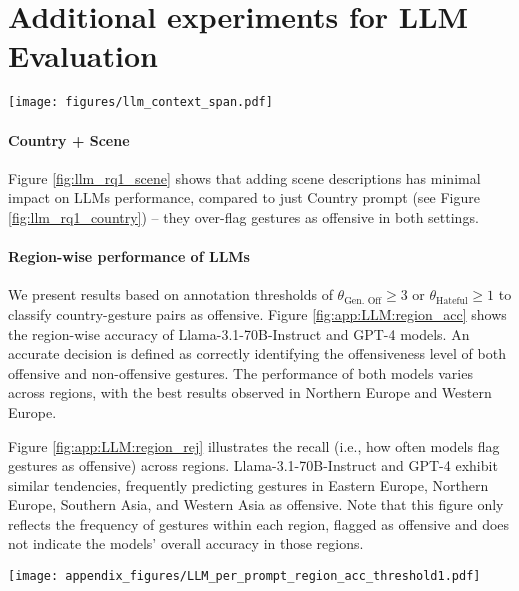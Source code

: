 \clearpage 
\section{Additional experiments for LLM Evaluation}
\label{app:llm_eval}
\begin{figure*}[t]
    \centering
    \texttt{[image: figures/llm\_context\_span.pdf]}
      \caption{LLMs are poor at detecting offensiveness level of non verbal gestures. They tend to over-flag gestures as offensive, leading to high recall and low specificity. Adding Scene information has minimal impact.} 
      \label{fig:llm_rq1_scene}
      
\end{figure*}
\paragraph{Country + Scene} Figure \ref{fig:llm_rq1_scene} shows that adding scene descriptions has minimal impact on LLMs performance, compared to just Country prompt (see Figure \ref{fig:llm_rq1_country}) -- they over-flag gestures as offensive in both settings. 



\paragraph{Region-wise performance of LLMs }
We present results based on annotation thresholds of $\theta_\text{Gen. Off} \geq 3$ or $\theta_\text{Hateful} \geq 1$ to classify country-gesture pairs as offensive.
Figure \ref{fig:app:LLM:region_acc} shows the region-wise accuracy of Llama-3.1-70B-Instruct and GPT-4 models. An accurate decision is defined as correctly identifying the offensiveness level of both offensive and non-offensive gestures. The performance of both models varies across regions, with the best results observed in Northern Europe and Western Europe.

Figure \ref{fig:app:LLM:region_rej} illustrates the recall (i.e., how often models flag gestures as offensive) across regions. Llama-3.1-70B-Instruct and GPT-4 exhibit similar tendencies, frequently predicting gestures in Eastern Europe, Northern Europe, Southern Asia, and Western Asia as offensive. Note that this figure only reflects the frequency of gestures within each region, flagged as offensive and does not indicate the models’ overall accuracy in those regions.

\begin{figure*}
    \centering
    \texttt{[image: appendix\_figures/LLM\_per\_prompt\_region\_acc\_threshold1.pdf]}
    \caption{We present region-wise accuracy of Llama-3.1-70B-Instruct and gpt-4 models, in detecting the offensiveness of gestures across regions. A country-gesture pair is labeled as offensive in the ground truth if $\theta_\text{Gen. Off} \geq 3$ or $\theta_\text{Hateful} \geq 1$. Higher accuracy indicates that models correctly identified offensive gestures as offensive and non-offensive gestures as non-offensive. The number of gestures per region in the \offHandsDataset is indicated in parentheses.}
    \label{fig:app:LLM:region_acc}
\end{figure*}

